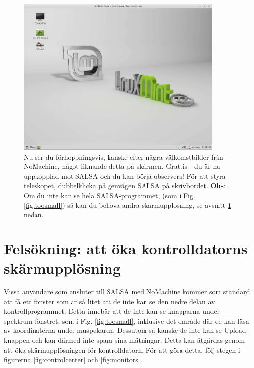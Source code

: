 \begin{figure}[H]
    \centering
	\includegraphics[width=0.9\textwidth]{../figures/nomachinefigs/fig9-connected.pdf}
	\caption{Nu ser du förhoppningsvis, kanske efter några välkomstbilder från
		NoMachine, något liknande detta på skärmen. Grattis - du är nu
		uppkopplad mot SALSA och du kan börja observera! För att styra
		teleskopet, dubbelklicka på genvägen SALSA på skrivbordet. {\bf Obs}:
		Om du inte kan se hela SALSA-programmet, (som i Fig.
		\ref{fig:toosmall}) så kan du behöva ändra skärmupplösning, se avsnitt
		\ref{sect:screenres} nedan.
} 
\label{fig:connected} 
\end{figure}

\section{Felsökning: att öka kontrolldatorns skärmupplösning}
\label{sect:screenres}
Vissa användare som ansluter till SALSA med NoMachine kommer som standard
att få ett fönster som är så litet att de inte kan se den nedre delan av kontrollprogrammet.
Detta innebär att de inte kan se knapparna under spektrum-fönstret, som i Fig. \ref{fig:toosmall}, 
inklusive det område där de kan läsa av koordinaterna under muspekaren. 
Dessutom så kanske de inte kan se Upload-knappen och kan därmed inte spara sina mätningar. 
Detta kan åtgärdas genom att öka skärmupplösningen för kontrolldatorn. För att göra detta,
följ stegen i figurerna \ref{fig:controlcenter} och \ref{fig:monitors}.

